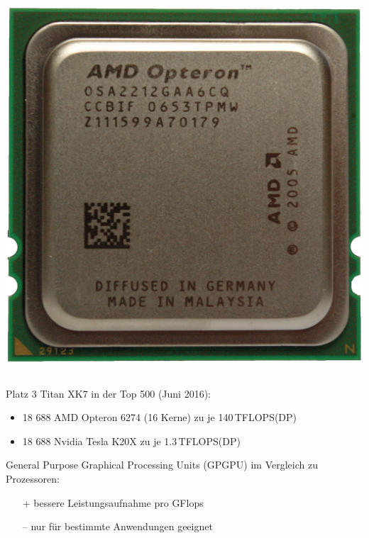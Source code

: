 \begin{frame}
\begin{columns}
\begin{column}{0.5\linewidth}
        \centerline{\includegraphics[height=0.15\textheight]{AMD_Opteron_2212_IMGP1795.jpg}}
    \end{column}\end{columns}
    Platz 3 Titan XK7 in der Top 500 (Juni 2016):
    \begin{itemize}
        \item 18 688 AMD Opteron 6274 (16 Kerne) zu je 140\,TFLOPS(DP)
        \item 18 688 Nvidia Tesla K20X zu je 1.3\,TFLOPS(DP)  %
    \end{itemize}
    General Purpose Graphical Processing Units (GPGPU) im Vergleich zu Prozessoren:
    \begin{itemize}
        \item[+] bessere Leistungsaufnahme pro GFlops
        \item[–] nur für bestimmte Anwendungen geeignet

\end{itemize}
\end{frame}
